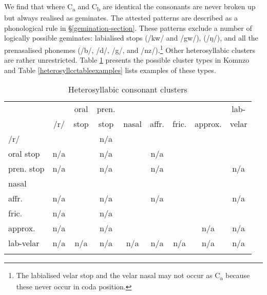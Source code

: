 We find that where C\textsubscript{a} and C\textsubscript{b} are identical the consonants are never broken up but always realised as geminates. The attested  patterns are described as a phonological rule in \S{}\ref{gemination-section}. These patterns exclude a number of logically possible geminates: labialised  stops (/kw/ and /gw/),   (/ŋ/), and all the prenasalised phonemes (/b/, /d/, /g/, and /nz/).\footnote{The labialised velar stop and the velar nasal may not occur as C\textsubscript{a} because these never occur in coda position.} Other heterosyllabic clusters are rather unrestricted. Table \ref{heterosyllcctable} presents the possible cluster types in Komnzo and Table \ref{heterosyllcctableexamples} lists examples of these types.

\begin{table}
\caption{Heterosyllabic consonant clusters}
\label{heterosyllcctable}
	\begin{tabular}{lcccccccc}
		\lsptoprule
		&&{oral}&{pren.}&&&&&{lab-}\\
		& /r/ & {stop} & {stop}\footnotemark & {nasal} & {affr.} & {fric.} & {approx.} & {velar}\\ \midrule
		/r/ & \checkmark & \checkmark & n/a & \checkmark & \checkmark & \checkmark & \checkmark  & \checkmark\\%
		{oral stop} & n/a & \checkmark & n/a & \checkmark & n/a & \checkmark & \checkmark  & \checkmark\\%
		{pren. stop} & n/a & \checkmark & n/a & \checkmark & n/a & \checkmark & \checkmark  & n/a\\%
		{nasal} & \checkmark & \checkmark & \checkmark & \checkmark & \checkmark & \checkmark & \checkmark  & \checkmark\\%
		{affr.} & n/a & \checkmark & n/a & \checkmark & n/a & \checkmark & \checkmark & n/a\\%
		{fric.} &  n/a & \checkmark & n/a & \checkmark & \checkmark & \checkmark & \checkmark  & \checkmark\\%
		{approx.} &  n/a & \checkmark & n/a & \checkmark & \checkmark & \checkmark & n/a  & n/a\\%
		{lab-velar} & n/a & n/a& n/a& n/a& n/a& n/a& n/a& n/a\\%
		\lspbottomrule
	\end{tabular}
\end{table}%
